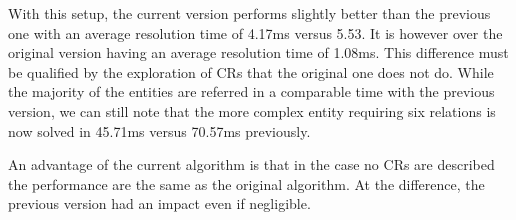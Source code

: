With this setup, the current version performs slightly better than the previous one with an average resolution time of 4.17ms versus 5.53. It is however over the original version having an average resolution time of 1.08ms. This difference must be qualified by the exploration of CRs that the original one does not do. While the majority of the entities are referred in a comparable time with the previous version, we can still note that the more complex entity requiring six relations is now solved in 45.71ms versus 70.57ms previously.

An advantage of the current algorithm is that in the case no CRs are described the performance are the same as the original algorithm. At the difference, the previous version had an impact even if negligible. 



